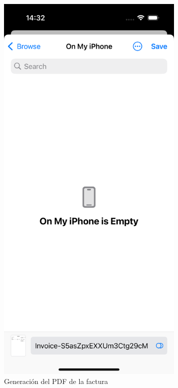 \begin{large}
\begin{figure}[H]
	\centering
  \begin{minipage}[t]{0.45\textwidth}
    \centering
    \includegraphics[width=0.8\textwidth]{Ilustraciones/ios_save_pdf.png}
    \caption{Generación del PDF de la factura}
    \label{fig:save_pdf}
  \end{minipage}
\end{figure}

\end{large}

